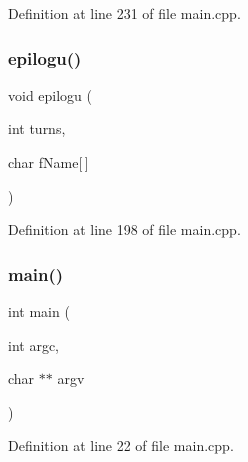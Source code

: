 Definition at line 231 of file main.\+cpp.

\label{main_8cpp_a87a5fc681e9a8635472d55c868497e23} 
\subsubsection{epilogu()}
{\footnotesize\ttfamily void epilogu (\begin{DoxyParamCaption}\item[{int}]{turns,  }\item[{char}]{f\+Name[$\,$] }\end{DoxyParamCaption})}



Definition at line 198 of file main.\+cpp.

\label{main_8cpp_a3c04138a5bfe5d72780bb7e82a18e627} 
\subsubsection{main()}
{\footnotesize\ttfamily int main (\begin{DoxyParamCaption}\item[{int}]{argc,  }\item[{char $\ast$$\ast$}]{argv }\end{DoxyParamCaption})}



Definition at line 22 of file main.\+cpp.

